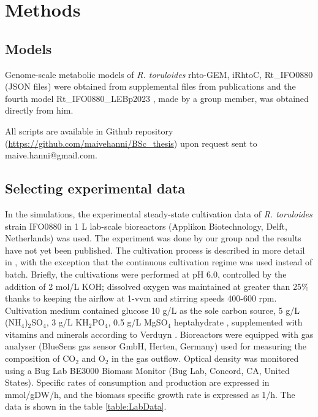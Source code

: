 \chapter{Methods}


\section{Models}

Genome-scale metabolic models of \textit{R. toruloides} rhto-GEM, iRhtoC, Rt\_IFO0880 (JSON files) were obtained from supplemental
files from publications \cite{Tiukova2019, Dinh2019, Kim2021} and the fourth model Rt\_IFO0880\_LEBp2023 \cite{DeBiaggi2023}, 
made by a group member, was obtained directly from him. 

All scripts are available in Github repository (\url{https://github.com/maivehanni/BSc_thesis}) upon request sent to maive.hanni@gmail.com.


\section{Selecting experimental data} \label{Exp_data}

In the simulations, the experimental steady-state cultivation data of \textit{R. toruloides} strain IFO0880 in 1 L lab-scale bioreactors (Applikon Biotechnology, Delft, Netherlands) was used.
The experiment was done by our group and the results have not yet been published. The cultivation process is described in more detail in \cite{Pinheiro2020}, with the exception that the continuous cultivation regime was used instead of batch. Briefly, the cultivations were performed at pH 6.0, controlled by the addition of 2 \unit{mol/L} KOH; dissolved oxygen was maintained at greater than 25\% thanks to keeping the airflow at 1-\unit{vvm} and stirring speeds 400-600 \unit{rpm}. Cultivation medium contained glucose 10 \unit{g/L} as the sole carbon source, 5 \unit{g/L} (NH$_4$)$_2$SO$_4$, 3 \unit{g/L} KH$_2$PO$_4$, 0.5 \unit{g/L} MgSO$_4$ heptahydrate \cite{Lahtvee2017}, supplemented with vitamins and minerals according to Verduyn \cite{Verduyn1992}. Bioreactors were equipped with gas analyser (BlueSens gas sensor GmbH, Herten, Germany) used for measuring the composition of CO$_2$ and O$_2$ in the gas outflow. Optical density was monitored using a Bug Lab BE3000 Biomass Monitor (Bug Lab, Concord, CA, United States).
Specific rates of consumption and production are expressed in \unit{mmol/gDW/h}, and the biomass specific growth rate is expressed as \unit{1/h}. The data is shown in the table \ref{table:LabData}.

